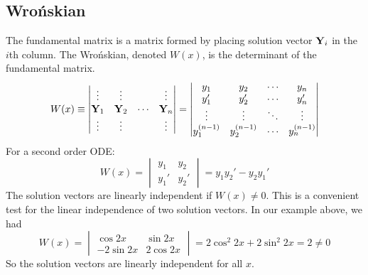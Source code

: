 \subsection{Wro\'nskian}
The fundamental matrix is a matrix formed by placing solution vector \(\vb Y_i\) in the \(i\)th column.
The Wro\'nskian, denoted \(W(x)\), is the determinant of the fundamental matrix.
\[
	W(x) \equiv \begin{vmatrix}
		\vdots  & \vdots  &        & \vdots  \\
		\vb Y_1 & \vb Y_2 & \cdots & \vb Y_n \\
		\vdots  & \vdots  &        & \vdots
	\end{vmatrix} = \begin{vmatrix}
		y_1         & y_2         & \cdots & y_n         \\
		y_1'        & y_2'        & \cdots & y_n'        \\
		\vdots      & \vdots      & \ddots & \vdots      \\
		y_1^{(n-1)} & y_2^{(n-1)} & \cdots & y_n^{(n-1)}
	\end{vmatrix}
\]
For a second order ODE:\@
\begin{equation}\label{wronskian2}
	W(x) = \begin{vmatrix}
		y_1 & y_2 \\ y_1' & y_2'
	\end{vmatrix}
	= y_1y_2' - y_2y_1'
\end{equation}
The solution vectors are linearly independent if \(W(x) \neq 0\).
This is a convenient test for the linear independence of two solution vectors.
In our example above, we had
\[
	W(x) = \begin{vmatrix}
		\cos 2x   & \sin 2x  \\
		-2\sin 2x & 2\cos 2x
	\end{vmatrix}
	= 2\cos^2 2x + 2\sin^2 2x = 2 \neq 0
\]
So the solution vectors are linearly independent for all \(x\).

